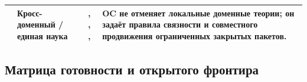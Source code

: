 \begin{longtable}{@{}L{0.20\textwidth}L{0.11\textwidth}L{0.33\textwidth}L{0.28\textwidth}@{}}
 & Кросс-доменный /\allowbreak единая наука & , \allowbreak {}, \allowbreak {}, \allowbreak {} & OC не отменяет локальные доменные теории; он задаёт правила связности и совместного продвижения ограниченных закрытых пакетов. \\
\bottomrule
\end{longtable}

\subsection{Матрица готовности и открытого фронтира}

